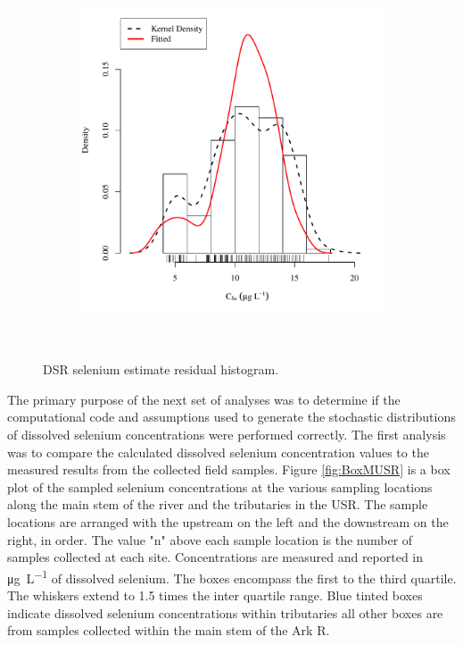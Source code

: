 \begin{linenumbers}
\subfiguremid
\begin{landscape}
	\begin{figure}
		\begin{subfigure}{0.7\textwidth}
			\centering
			\includegraphics[width=\tableCustomSize]{"Figures/Results_DSR/Stochastic/Conc Model ResDist DDIV"}
		\end{subfigure}\\
		\caption{DSR selenium estimate residual histogram.}
	\end{figure}
\end{landscape}
\subfiguretop


The primary purpose of the next set of analyses was to determine if the computational code and assumptions used to generate the stochastic distributions of dissolved selenium concentrations were performed correctly. The first analysis was to compare the calculated dissolved selenium concentration values to the measured results from the collected field samples.  Figure \ref{fig:BoxMUSR} is a box plot of the sampled selenium concentrations at the various sampling locations along the main stem of the river and the tributaries in the USR.  The sample locations are arranged with the upstream on the left and the downstream on the right, in order.  The value "n" above each sample location is the number of samples collected at each site.  Concentrations are measured and reported in \si{\micro\gram\per\liter} of dissolved selenium.  The boxes encompass the first to the third quartile.  The whiskers extend to 1.5 times the inter quartile range.  Blue tinted boxes indicate dissolved selenium concentrations within tributaries all other boxes are from samples collected within the main stem of the Ark R.


\end{linenumbers}
